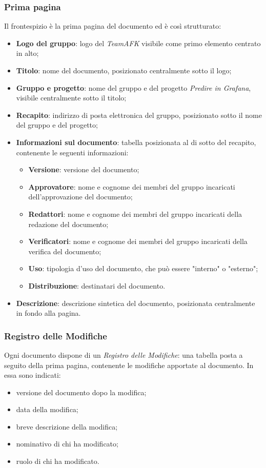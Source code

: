 \subsubsection{Prima pagina}
Il frontespizio è la prima pagina del documento ed è così strutturato:\begin{itemize}
\item \textbf{Logo del gruppo}: logo del \textit{TeamAFK} visibile come primo elemento centrato in alto;
\item \textbf{Titolo}: nome del documento, posizionato centralmente sotto il logo;
\item \textbf{Gruppo e progetto}: nome del gruppo e del progetto \textit{Predire in Grafana}, visibile centralmente sotto il titolo;
\item \textbf{Recapito}: indirizzo di posta elettronica del gruppo, posizionato sotto il nome del gruppo e del progetto;
\item \textbf{Informazioni sul documento}: tabella posizionata al di sotto del recapito, contenente le seguenti informazioni: \begin{itemize}
\item \textbf{Versione}: versione del documento;
\item \textbf{Approvatore}: nome e cognome dei membri del gruppo incaricati dell'approvazione del documento;
\item \textbf{Redattori}: nome e cognome dei membri del gruppo incaricati della redazione del documento;
\item \textbf{Verificatori}: nome e cognome dei membri del gruppo incaricati della verifica del documento;
\item \textbf{Uso}: tipologia d'uso del documento, che può essere "interno" o "esterno";
\item \textbf{Distribuzione}: destinatari del documento.
\end{itemize}
\item \textbf{Descrizione}: descrizione sintetica del documento, posizionata centralmente in fondo alla pagina.
\end{itemize}

\subsubsection{Registro delle Modifiche}
Ogni documento dispone di un \textit{Registro delle Modifiche}: una tabella posta a seguito della prima pagina, contenente le modifiche apportate al documento. In essa sono indicati: \begin{itemize}
\item versione del documento dopo la modifica;
\item data della modifica;
\item breve descrizione della modifica;
\item nominativo di chi ha modificato;
\item ruolo di chi ha modificato.
\end{itemize}

